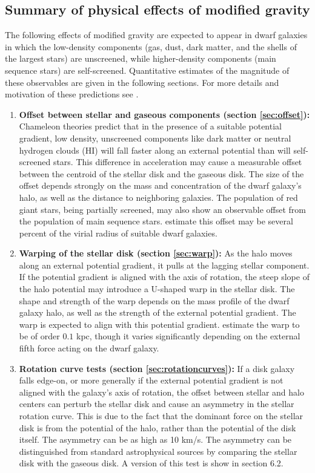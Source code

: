 \documentclass[useAMS,usenatbib,twocolumn]{mn2e}
\newcommand{\jakesays}[1]{{\color{red}[Jake says: #1]}}
\begin{document}
\subsection{Summary of physical effects of modified gravity}
The following effects of modified gravity are expected to appear in 
dwarf galaxies in which the
low-density components (gas, dust, dark matter, and
the shells of the largest stars) are unscreened, while higher-density
components (main sequence stars) are self-screened.
Quantitative estimates of the magnitude of these
observables are given in the following sections.
For more details and motivation of these predictions see \citet{bhuvjake2011}. 

\begin{enumerate}
\item \textbf{Offset between stellar and gaseous components (section
\ref{sec:offset}):}
Chameleon theories predict that in the presence of a suitable
potential gradient, low density, unscreened components like dark matter or
neutral hydrogen clouds (HI) will fall faster along an external potential
than will self-screened stars. 
This difference in acceleration may cause a measurable offset between the
centroid of the stellar disk and the gaseous disk. 
The size of the offset
depends strongly on the mass and concentration of the dwarf galaxy's halo,
as well as the distance to neighboring galaxies.
The population of red giant stars, being partially screened, may also show
an observable offset from the population of main sequence stars.
\citet{bhuvjake2011} estimate this offset may be several percent of the virial
radius of suitable dwarf galaxies.

\item \textbf{Warping of the stellar disk (section \ref{sec:warp}):}
As the halo moves along an external potential gradient,
it pulls at the lagging stellar component.  If the potential gradient
is aligned with the axis of rotation, the steep slope of the halo potential
may introduce a U-shaped warp in the stellar disk.
The shape and strength of the warp depends on the mass profile of the dwarf
galaxy halo, as well as the strength of the external potential gradient. The
warp  
 is expected to align with this potential gradient.
\citet{bhuvjake2011} estimate the warp to be of order $0.1$ kpc, though it
varies significantly depending on the external fifth force acting on the dwarf
galaxy.  

\item \textbf{Rotation curve tests (section \ref{sec:rotationcurves}):}
If a disk galaxy falls edge-on, or more generally if the external potential
gradient is not aligned with the galaxy's axis of
rotation, the offset between stellar and halo centers can perturb the stellar
disk
and cause an asymmetry in the stellar rotation curve. This is due to the fact
that the dominant force on the stellar disk is from the potential of the halo,
rather than the potential of the disk itself. The asymmetry
can be as high as 10 km/s. 
The asymmetry can be distinguished from standard astrophysical sources  
by comparing the stellar disk with the gaseous disk.  A version of this test is
show in section 6.2. 


\end{enumerate}
\end{document}
